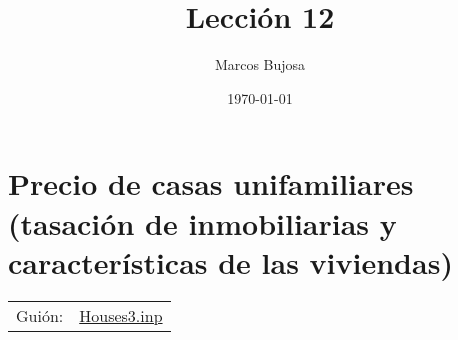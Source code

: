 \documentclass[11pt]{article}
\author{Marcos Bujosa}
\date{\today}
\title{Lección 12}
\begin{document}
\maketitle
\tableofcontents

\clearpage

\section{Precio de casas unifamiliares (tasación de inmobiliarias y características de las viviendas)}
\label{sec:orgba3e995}
\begin{center}
\begin{tabular}{ll}
Guión: & \href{https://github.com/mbujosab/Ectr/tree/master/Practicas/Gretl/scripts/Houses3.inp}{Houses3.inp}\\
\end{tabular}
\end{center}
\end{document}
